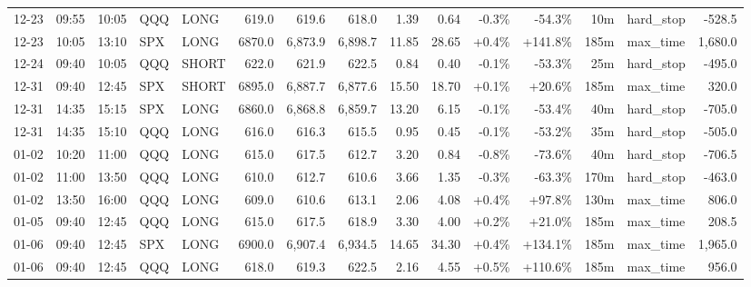 \documentclass[11pt,a4paper,twoside]{article}
\begin{document}
\begin{landscape}
\begin{center}
\begin{longtable}{>{\color{txtmain}}l l l l l r r r r r r r r >{\color{txtmain}}l r}
12-23 & 09:55 & 10:05 & QQQ & LONG & 619.0 & 619.6 & 618.0 & 1.39 & 0.64 & \textcolor{lossred}{-0.3\%} & \textcolor{lossred}{-54.3\%} & 10m & hard\_stop & \textcolor{lossred}{-528.5} \\
12-23 & 10:05 & 13:10 & SPX & LONG & 6870.0 & 6,873.9 & 6,898.7 & 11.85 & 28.65 & \textcolor{wingreen}{+0.4\%} & \textcolor{wingreen}{+141.8\%} & 185m & max\_time & \textcolor{wingreen}{1,680.0} \\
12-24 & 09:40 & 10:05 & QQQ & SHORT & 622.0 & 621.9 & 622.5 & 0.84 & 0.40 & \textcolor{lossred}{-0.1\%} & \textcolor{lossred}{-53.3\%} & 25m & hard\_stop & \textcolor{lossred}{-495.0} \\
12-31 & 09:40 & 12:45 & SPX & SHORT & 6895.0 & 6,887.7 & 6,877.6 & 15.50 & 18.70 & \textcolor{wingreen}{+0.1\%} & \textcolor{wingreen}{+20.6\%} & 185m & max\_time & \textcolor{wingreen}{320.0} \\
12-31 & 14:35 & 15:15 & SPX & LONG & 6860.0 & 6,868.8 & 6,859.7 & 13.20 & 6.15 & \textcolor{lossred}{-0.1\%} & \textcolor{lossred}{-53.4\%} & 40m & hard\_stop & \textcolor{lossred}{-705.0} \\
12-31 & 14:35 & 15:10 & QQQ & LONG & 616.0 & 616.3 & 615.5 & 0.95 & 0.45 & \textcolor{lossred}{-0.1\%} & \textcolor{lossred}{-53.2\%} & 35m & hard\_stop & \textcolor{lossred}{-505.0} \\
01-02 & 10:20 & 11:00 & QQQ & LONG & 615.0 & 617.5 & 612.7 & 3.20 & 0.84 & \textcolor{lossred}{-0.8\%} & \textcolor{lossred}{-73.6\%} & 40m & hard\_stop & \textcolor{lossred}{-706.5} \\
01-02 & 11:00 & 13:50 & QQQ & LONG & 610.0 & 612.7 & 610.6 & 3.66 & 1.35 & \textcolor{lossred}{-0.3\%} & \textcolor{lossred}{-63.3\%} & 170m & hard\_stop & \textcolor{lossred}{-463.0} \\
01-02 & 13:50 & 16:00 & QQQ & LONG & 609.0 & 610.6 & 613.1 & 2.06 & 4.08 & \textcolor{wingreen}{+0.4\%} & \textcolor{wingreen}{+97.8\%} & 130m & max\_time & \textcolor{wingreen}{806.0} \\
01-05 & 09:40 & 12:45 & QQQ & LONG & 615.0 & 617.5 & 618.9 & 3.30 & 4.00 & \textcolor{wingreen}{+0.2\%} & \textcolor{wingreen}{+21.0\%} & 185m & max\_time & \textcolor{wingreen}{208.5} \\
01-06 & 09:40 & 12:45 & SPX & LONG & 6900.0 & 6,907.4 & 6,934.5 & 14.65 & 34.30 & \textcolor{wingreen}{+0.4\%} & \textcolor{wingreen}{+134.1\%} & 185m & max\_time & \textcolor{wingreen}{1,965.0} \\
01-06 & 09:40 & 12:45 & QQQ & LONG & 618.0 & 619.3 & 622.5 & 2.16 & 4.55 & \textcolor{wingreen}{+0.5\%} & \textcolor{wingreen}{+110.6\%} & 185m & max\_time & \textcolor{wingreen}{956.0} \\

\end{longtable}
\end{center}
\end{landscape}
\end{document}
